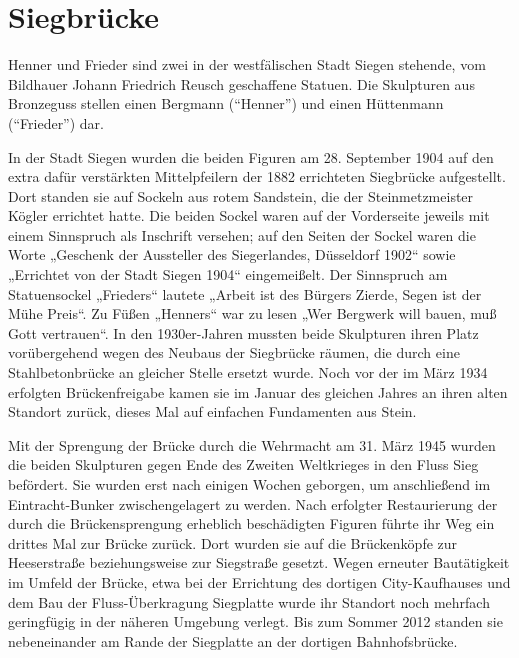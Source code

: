 \documentclass[paper=a4, fontsize=11pt]{scrartcl} %
\numberwithin{equation}{section}		%
\numberwithin{figure}{section}			%
\numberwithin{table}{section}			%
\begin{document}
\section{Siegbrücke}
Henner und Frieder sind zwei in der westfälischen Stadt Siegen stehende, vom Bildhauer Johann Friedrich Reusch geschaffene Statuen. Die Skulpturen aus Bronzeguss stellen einen Bergmann (\enquote{Henner}) und einen Hüttenmann (\enquote{Frieder}) dar.\par
In der Stadt Siegen wurden die beiden Figuren am 28. September 1904 auf den extra dafür verstärkten Mittelpfeilern der 1882 errichteten Siegbrücke aufgestellt. Dort standen sie auf Sockeln aus rotem Sandstein, die der Steinmetzmeister Kögler errichtet hatte. Die beiden Sockel waren auf der Vorderseite jeweils mit einem Sinnspruch als Inschrift versehen; auf den Seiten der Sockel waren die Worte „Geschenk der Aussteller des Siegerlandes, Düsseldorf 1902“ sowie „Errichtet von der Stadt Siegen 1904“ eingemeißelt. Der Sinnspruch am Statuensockel „Frieders“ lautete „Arbeit ist des Bürgers Zierde, Segen ist der Mühe Preis“. Zu Füßen „Henners“ war zu lesen „Wer Bergwerk will bauen, muß Gott vertrauen“. In den 1930er-Jahren mussten beide Skulpturen ihren Platz vorübergehend wegen des Neubaus der Siegbrücke räumen, die durch eine Stahlbetonbrücke an gleicher Stelle ersetzt wurde. Noch vor der im März 1934 erfolgten Brückenfreigabe kamen sie im Januar des gleichen Jahres an ihren alten Standort zurück, dieses Mal auf einfachen Fundamenten aus Stein.\par
Mit der Sprengung der Brücke durch die Wehrmacht am 31. März 1945 wurden die beiden Skulpturen gegen Ende des Zweiten Weltkrieges in den Fluss Sieg befördert. Sie wurden erst nach einigen Wochen geborgen, um anschließend im Eintracht-Bunker zwischengelagert zu werden. Nach erfolgter Restaurierung der durch die Brückensprengung erheblich beschädigten Figuren führte ihr Weg ein drittes Mal zur Brücke zurück. Dort wurden sie auf die Brückenköpfe zur Heeserstraße beziehungsweise zur Siegstraße gesetzt. Wegen erneuter Bautätigkeit im Umfeld der Brücke, etwa bei der Errichtung des dortigen City-Kaufhauses und dem Bau der Fluss-Überkragung Siegplatte wurde ihr Standort noch mehrfach geringfügig in der näheren Umgebung verlegt. Bis zum Sommer 2012 standen sie nebeneinander am Rande der Siegplatte an der dortigen Bahnhofsbrücke.

\end{document}
